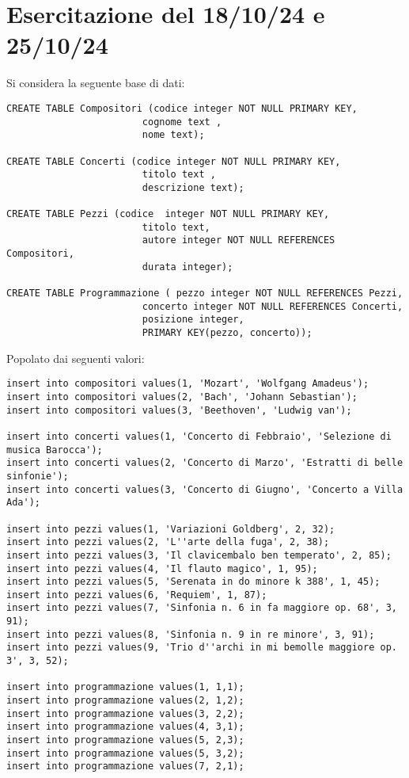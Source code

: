 \documentclass{article}
\numberwithin{equation}{subsection}
\begin{document}
\clearpage

\section{Esercitazione del 18/10/24 e 25/10/24}


Si considera la seguente base di dati:
\begin{verbatim}
CREATE TABLE Compositori (codice integer NOT NULL PRIMARY KEY,
                        cognome text ,
                        nome text);
						
CREATE TABLE Concerti (codice integer NOT NULL PRIMARY KEY,
                        titolo text ,
                        descrizione text);

CREATE TABLE Pezzi (codice  integer NOT NULL PRIMARY KEY,
                        titolo text,
                        autore integer NOT NULL REFERENCES Compositori,
                        durata integer);

CREATE TABLE Programmazione ( pezzo integer NOT NULL REFERENCES Pezzi,
                        concerto integer NOT NULL REFERENCES Concerti, 
                        posizione integer,
                        PRIMARY KEY(pezzo, concerto));

\end{verbatim}

Popolato dai seguenti valori:
\begin{verbatim}
insert into compositori values(1, 'Mozart', 'Wolfgang Amadeus');
insert into compositori values(2, 'Bach', 'Johann Sebastian');
insert into compositori values(3, 'Beethoven', 'Ludwig van');

insert into concerti values(1, 'Concerto di Febbraio', 'Selezione di musica Barocca');
insert into concerti values(2, 'Concerto di Marzo', 'Estratti di belle sinfonie');
insert into concerti values(3, 'Concerto di Giugno', 'Concerto a Villa Ada');

insert into pezzi values(1, 'Variazioni Goldberg', 2, 32);
insert into pezzi values(2, 'L''arte della fuga', 2, 38);
insert into pezzi values(3, 'Il clavicembalo ben temperato', 2, 85);
insert into pezzi values(4, 'Il flauto magico', 1, 95);
insert into pezzi values(5, 'Serenata in do minore k 388', 1, 45);
insert into pezzi values(6, 'Requiem', 1, 87);
insert into pezzi values(7, 'Sinfonia n. 6 in fa maggiore op. 68', 3, 91);
insert into pezzi values(8, 'Sinfonia n. 9 in re minore', 3, 91);
insert into pezzi values(9, 'Trio d''archi in mi bemolle maggiore op. 3', 3, 52);

insert into programmazione values(1, 1,1);
insert into programmazione values(2, 1,2);
insert into programmazione values(3, 2,2);
insert into programmazione values(4, 3,1);
insert into programmazione values(5, 2,3);
insert into programmazione values(5, 3,2);
insert into programmazione values(7, 2,1);
\end{verbatim}
\end{document}

